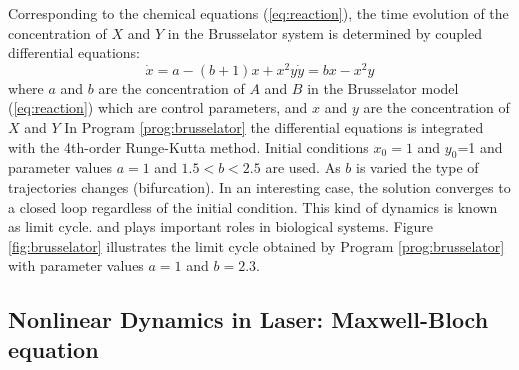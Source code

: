 Corresponding to the chemical equations (\ref{eq:reaction}), the time
evolution of the concentration of $X$ and $Y$ in the Brusselator system is determined by
coupled differential equations:
\begin{subequations}
\label{eq:brusselator}
\begin{equation}
\dot{x} = a-(b+1)x + x^2 y
\end{equation}
\begin{equation}
\dot{y} = bx - x^2 y
\end{equation}
\end{subequations}
where $a$ and $b$ are the concentration of $A$ and $B$ in the Brusselator
model (\ref{eq:reaction}) which are control parameters, and
$x$ and $y$ are the concentration of $X$ and $Y$  In Program \ref{prog:brusselator} the differential equations is integrated with the 4th-order Runge-Kutta method.  Initial conditions
$x_0=1$ and $y_0$=1 and parameter values $a=1$ and $1.5<b<2.5$ are used. As $b$ is varied the type of trajectories changes (bifurcation). 
In an interesting case, the solution converges to a closed loop regardless of the initial condition. This kind of dynamics is known as limit cycle.\cite{brusselator} and plays important roles in biological systems.\cite{limitcycle1,limitcycle2} Figure \ref{fig:brusselator} illustrates the limit cycle obtained by Program \ref{prog:brusselator} with parameter values $a=1$ and $b=2.3$.


\subsection{Nonlinear Dynamics in Laser: Maxwell-Bloch equation}\label{sec:maxwell_bloch}

